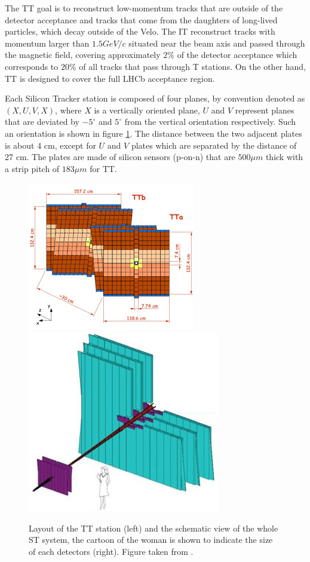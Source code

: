 The TT goal is to reconstruct low-momentum tracks that are outside of the detector acceptance and tracks that come from the daughters of long-lived particles, which decay outside of the Velo. The IT reconstruct tracks with momentum larger than $1.5 GeV/c$ situated near the beam axis and passed through the magnetic field, covering approximately $2\%$ of the detector acceptance which corresponds to $20\%$ of all tracks that pass through T stations. On the other hand, TT is designed to cover the full LHCb acceptance region.  

Each Silicon Tracker station is composed of four planes, by convention denoted as $(X, U, V, X)$, where $X$ is a vertically oriented plane,  $U$ and $V$  represent planes that are deviated by $-5^{\circ}$ and $5^{\circ}$ from the vertical orientation respectively. Such an orientation is shown in figure \ref{fig:TT}. The distance between the two adjacent plates is about 4 cm, except for $U$ and $V$ plates which are separated by the distance of 27 cm. 
The plates are made of silicon sensors (p-on-n)  that are $500 \mu m$ thick with a strip pitch of $183 \mu m$ for TT.  


\begin{figure}[h]
 \begin{center}
  \includegraphics[width=0.49\linewidth]{figures/TT-layout.jpg}
   \includegraphics[width=0.49\linewidth]{figures/Tracking-system-diagram-2.jpg}
   \caption{Layout of the TT station (left) and the schematic view of the whole ST system, the cartoon of the woman is shown to indicate the size of each detectors (right). Figure taken from \cite{lhcb}.  
     \label{fig:TT}}
 \end{center}
\end{figure}



